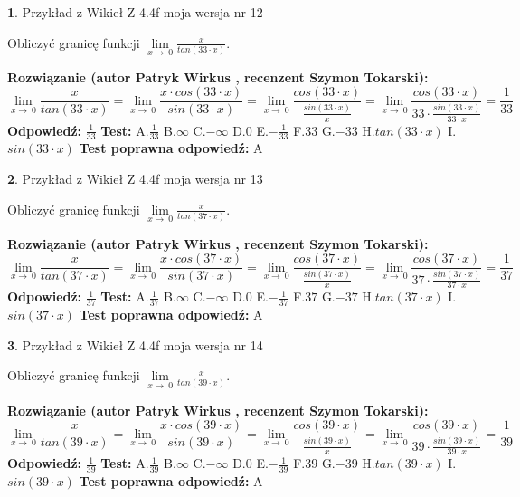 \documentclass[12pt, a4paper]{article}
\theoremstyle{definition} %
\newtheorem{zad}{}
\newcommand{\zadStart}[1]{\begin{zad}#1\newline}
\newcommand{\zadStop}{\end{zad}}
\newcommand{\rozwStart}[2]{\noindent \textbf{Rozwiązanie (autor #1 , recenzent #2): }\newline}
\newcommand{\rozwStop}{\newline}
\newcommand{\odpStart}{\noindent \textbf{Odpowiedź:}\newline}
\newcommand{\odpStop}{\newline}
\newcommand{\testStart}{\noindent \textbf{Test:}\newline}
\newcommand{\testStop}{\newline}
\newcommand{\kluczStart}{\noindent \textbf{Test poprawna odpowiedź:}\newline}
\newcommand{\kluczStop}{\newline}
\begin{document}
\zadStart{Przykład z Wikieł Z 4.4f moja wersja nr 12}


Obliczyć granicę funkcji $\lim\limits_{x\to\ 0}\frac{x}{tan(33 \cdot x)}$.
\zadStop
\rozwStart{Patryk Wirkus}{Szymon Tokarski}
$$\lim\limits_{x\to\ 0}\frac{x}{tan(33 \cdot x)}=\lim\limits_{x\to\ 0}\frac{x \cdot cos(33 \cdot x)}{sin(33 \cdot x)}=\lim\limits_{x\to\ 0}\frac{cos(33 \cdot x)}{\frac{sin(33 \cdot x)}{x}}=\lim\limits_{x\to\ 0}\frac{cos(33 \cdot x)}{33 \cdot \frac{sin(33 \cdot x)}{33 \cdot x}} = \frac{1}{33}$$
\rozwStop
\odpStart
$\frac{1}{33}$
\odpStop
\testStart
A.$\frac{1}{33}$
B.$\infty$
C.$-\infty$
D.$0$
E.$-\frac{1}{33}$
F.$33$
G.$-33$
H.$tan(33 \cdot x)$
I.$sin(33 \cdot x)$
\testStop
\kluczStart
A
\kluczStop



\zadStart{Przykład z Wikieł Z 4.4f moja wersja nr 13}


Obliczyć granicę funkcji $\lim\limits_{x\to\ 0}\frac{x}{tan(37 \cdot x)}$.
\zadStop
\rozwStart{Patryk Wirkus}{Szymon Tokarski}
$$\lim\limits_{x\to\ 0}\frac{x}{tan(37 \cdot x)}=\lim\limits_{x\to\ 0}\frac{x \cdot cos(37 \cdot x)}{sin(37 \cdot x)}=\lim\limits_{x\to\ 0}\frac{cos(37 \cdot x)}{\frac{sin(37 \cdot x)}{x}}=\lim\limits_{x\to\ 0}\frac{cos(37 \cdot x)}{37 \cdot \frac{sin(37 \cdot x)}{37 \cdot x}} = \frac{1}{37}$$
\rozwStop
\odpStart
$\frac{1}{37}$
\odpStop
\testStart
A.$\frac{1}{37}$
B.$\infty$
C.$-\infty$
D.$0$
E.$-\frac{1}{37}$
F.$37$
G.$-37$
H.$tan(37 \cdot x)$
I.$sin(37 \cdot x)$
\testStop
\kluczStart
A
\kluczStop



\zadStart{Przykład z Wikieł Z 4.4f moja wersja nr 14}


Obliczyć granicę funkcji $\lim\limits_{x\to\ 0}\frac{x}{tan(39 \cdot x)}$.
\zadStop
\rozwStart{Patryk Wirkus}{Szymon Tokarski}
$$\lim\limits_{x\to\ 0}\frac{x}{tan(39 \cdot x)}=\lim\limits_{x\to\ 0}\frac{x \cdot cos(39 \cdot x)}{sin(39 \cdot x)}=\lim\limits_{x\to\ 0}\frac{cos(39 \cdot x)}{\frac{sin(39 \cdot x)}{x}}=\lim\limits_{x\to\ 0}\frac{cos(39 \cdot x)}{39 \cdot \frac{sin(39 \cdot x)}{39 \cdot x}} = \frac{1}{39}$$
\rozwStop
\odpStart
$\frac{1}{39}$
\odpStop
\testStart
A.$\frac{1}{39}$
B.$\infty$
C.$-\infty$
D.$0$
E.$-\frac{1}{39}$
F.$39$
G.$-39$
H.$tan(39 \cdot x)$
I.$sin(39 \cdot x)$
\testStop
\kluczStart
A
\kluczStop
\end{document}
